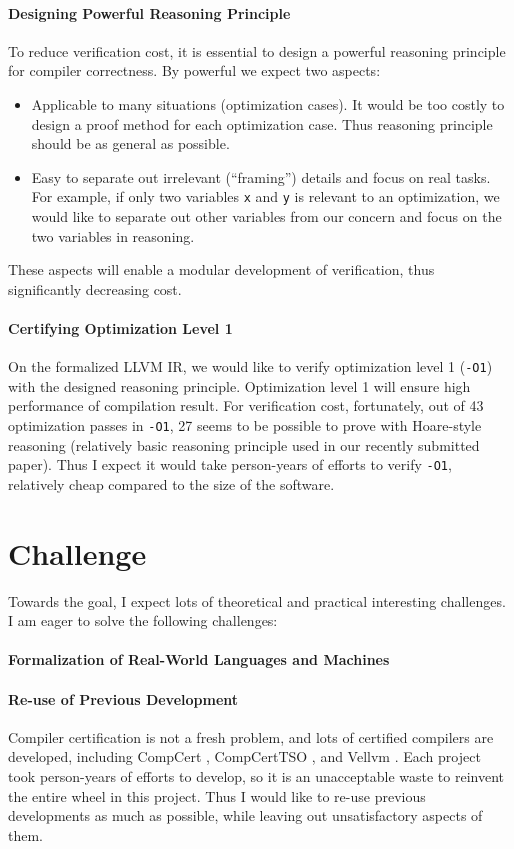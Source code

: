 \documentclass[nocopyrightspace]{sigplanconf}
\begin{document}
\paragraph{Designing Powerful Reasoning Principle}
To reduce verification cost, it is essential to design a powerful
reasoning principle for compiler correctness.  By powerful we expect
two aspects:
\begin{itemize}
\item Applicable to many situations (optimization cases).  It would be
  too costly to design a proof method for each optimization case.
  Thus reasoning principle should be as general as possible.
\item Easy to separate out irrelevant (``framing'') details and focus
  on real tasks.  For example, if only two variables \texttt{x} and
  \texttt{y} is relevant to an optimization, we would like to separate
  out other variables from our concern and focus on the two variables
  in reasoning.
\end{itemize}
These aspects will enable a modular development of verification, thus
significantly decreasing cost.

\paragraph{Certifying Optimization Level 1}
On the formalized LLVM IR, we would like to verify optimization level
1 (\texttt{-O1}) with the designed reasoning principle.  Optimization
level 1 will ensure high performance of compilation result.  For
verification cost, fortunately, out of 43 optimization passes in
\texttt{-O1}, 27 seems to be possible to prove with Hoare-style
reasoning (relatively basic reasoning principle used in our recently
submitted paper).  Thus I expect it would take person-years of efforts
to verify \texttt{-O1}, relatively cheap compared to the size of the
software.

\section{Challenge}
Towards the goal, I expect lots of theoretical and practical
interesting challenges.  I am eager to solve the following challenges:

\paragraph{Formalization of Real-World Languages and Machines}

\paragraph{Re-use of Previous Development}
Compiler certification is not a fresh problem, and lots of certified
compilers are developed, including CompCert \cite{TODO}, CompCertTSO
\cite{TODO}, and Vellvm \cite{TODO}.  Each project took person-years
of efforts to develop, so it is an unacceptable waste to reinvent the
entire wheel in this project.  Thus I would like to re-use previous
developments as much as possible, while leaving out unsatisfactory
aspects of them.
\end{document}
